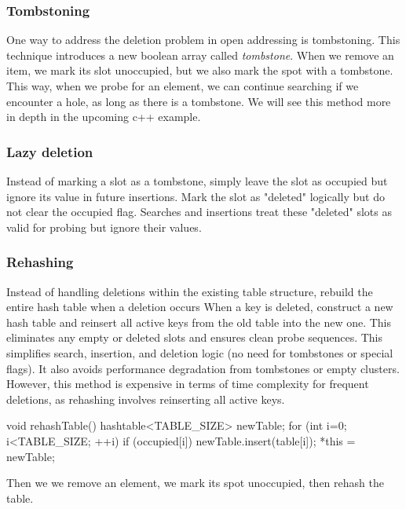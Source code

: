 \documentclass{report}
\begin{document}
\subsubsection{Tombstoning}
\bigbreak \noindent 
One way to address the deletion problem in open addressing is tombstoning. This technique introduces a new boolean array called \textit{tombstone}. When we remove an item, we mark its slot unoccupied, but we also mark the spot with a tombstone. This way, when we probe for an element, we can continue searching if we encounter a hole, as long as there is a tombstone. We will see this method more in depth in the upcoming c++ example.

\bigbreak \noindent 
\subsubsection{Lazy deletion}
\bigbreak \noindent 
Instead of marking a slot as a tombstone, simply leave the slot as occupied but ignore its value in future insertions.
\bigbreak \noindent 
Mark the slot as "deleted" logically but do not clear the occupied flag.
\bigbreak \noindent 
Searches and insertions treat these "deleted" slots as valid for probing but ignore their values.

\bigbreak \noindent 
\subsubsection{Rehashing}
\bigbreak \noindent 
Instead of handling deletions within the existing table structure, rebuild the entire hash table when a deletion occurs
\bigbreak \noindent 
When a key is deleted, construct a new hash table and reinsert all active keys from the old table into the new one.
\bigbreak \noindent 
This eliminates any empty or deleted slots and ensures clean probe sequences.
\bigbreak \noindent 
This simplifies search, insertion, and deletion logic (no need for tombstones or special flags).
\bigbreak \noindent 
It also avoids performance degradation from tombstones or empty clusters.
\bigbreak \noindent 
However, this method is expensive in terms of time complexity for frequent deletions, as rehashing involves reinserting all active keys.
\bigbreak \noindent 
\begin{cppcode}
    void rehashTable() {
        hashtable<TABLE_SIZE> newTable;
        for (int i=0; i<TABLE_SIZE; ++i) {
            if (occupied[i]) {
                newTable.insert(table[i]);
            }
        }
        *this = newTable;
    }
\end{cppcode}
\bigbreak \noindent 
Then we we remove an element, we mark its spot unoccupied, then rehash the table.
\bigbreak \noindent 
\begin{cppcode}
    while (occupied[index]) {
        if (table[index] == key) {
            // Key found, mark as removed
            occupied[index] = false;
            rehashTable();
            return true;
        }
        ...
\end{cppcode}
\end{document}

